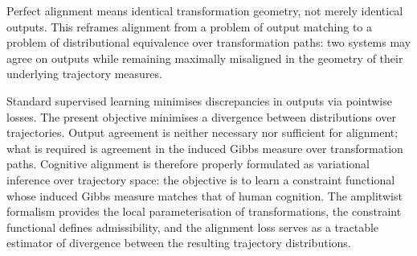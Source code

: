 \documentclass[12pt, a4paper]{article}
\theoremstyle{remark}
\theoremstyle{definition}
\begin{document}
Perfect alignment means identical transformation geometry, not merely identical outputs.
This reframes alignment from a problem of output matching to a problem of distributional
equivalence over transformation paths: two systems may agree on outputs while remaining
maximally misaligned in the geometry of their underlying trajectory measures.

Standard supervised learning minimises discrepancies in outputs via pointwise losses.  The
present objective minimises a divergence between distributions over trajectories.  Output
agreement is neither necessary nor sufficient for alignment; what is required is agreement
in the induced Gibbs measure over transformation paths.  Cognitive alignment is therefore
properly formulated as variational inference over trajectory space: the objective is to
learn a constraint functional whose induced Gibbs measure matches that of human cognition.
The amplitwist formalism provides the local parameterisation of transformations, the
constraint functional defines admissibility, and the alignment loss serves as a tractable
estimator of divergence between the resulting trajectory distributions.
\end{document}
